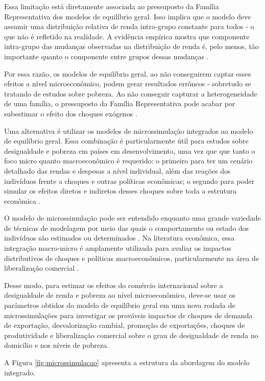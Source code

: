 Essa limitação está diretamente associada ao pressuposto da Família Representativa dos modelos de equilíbrio geral. Isso implica que o modelo deve assumir uma distribuição relativa de renda intra-grupo constante para todos - o que não é refletido na realidade. A evidência empírica mostra que componente intra-grupo das mudanças observadas na distribuição de renda é, pelo menos, tão importante quanto o componente entre grupos dessas mudanças \cite{colombo08}.

Por essa razão, os modelos de equilíbrio geral, ao não conseguirem captar esses efeitos a nível microeconômico, podem gerar resultados errôneos - sobretudo se tratando de estudos sobre pobreza. Ao não conseguir capturar a heterogeneidade de uma família, o pressuposto da Família Representativa pode acabar por subestimar o efeito dos choques exógenos \cite{colombo08}. 

Uma alternativa é utilizar os modelos de microssimulação integrados ao modelo de equilíbrio geral. Essa combinação é particularmente útil para estudos sobre desigualdade e pobreza em países em desenvolvimento, uma vez que que tanto o foco micro quanto macroeconômico é requerido: o primeiro para ter um cenário detalhado das rendas e despesas a nível individual, além das reações dos indivíduos frente a choques e outras políticas econômicas; o segundo para poder simular os efeitos diretos e indiretos desses choques sobre toda a estrutura econômica \cite{tiberti17, klevmarken22}.

O modelo de microssimulação pode ser entendido enquanto uma grande variedade de técnicas de modelagem por meio das quais o comportamento ou estado dos indivíduos são estimados ou determinados \cite{figari15}. Na literatura econômica, essa integração macro-micro é amplamente utilizada para avaliar os impactos distributivos de choques e políticas macroeconômicos, particularmente
na área de liberalização comercial \cite{carneiro06, ferreira06, raihan10, cicowiez16, mbanda21}.

Desse modo, para estimar os efeitos do comércio internacional sobre a desigualdade de renda e pobreza ao nível microeconômico, deve-se usar os parâmetros obtidos do modelo de equilíbrio geral em uma nova rodada de microssimulações para investigar os prováveis impactos de choques de demanda de exportação, desvalorização cambial, promoção de exportações, choques de produtividade e liberalização comercial sobre o grau de desigualdade de renda no domicílio e nos níveis de pobreza.

A Figura \ref{fig:microssimulacao} apresenta a estrutura da abordagem do modelo integrado.

